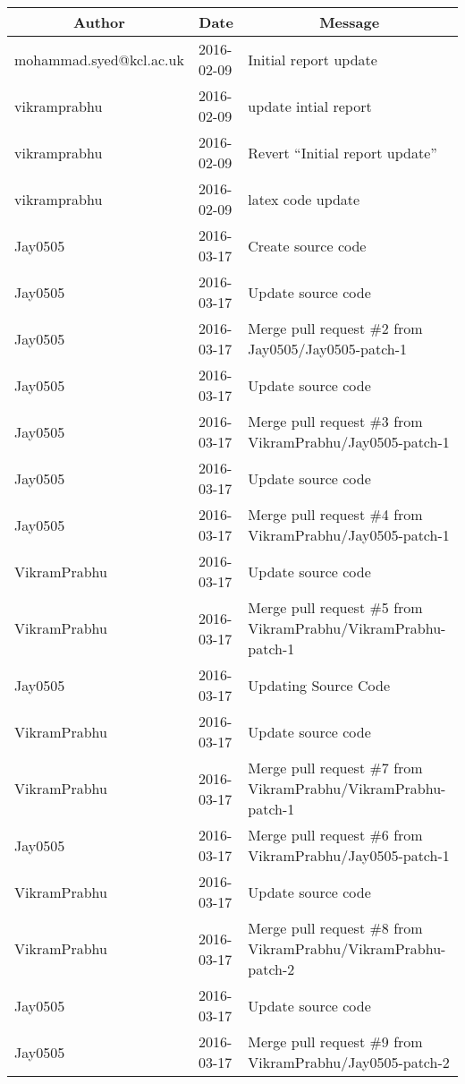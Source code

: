 \documentclass[a4paper]{article}
\begin{document}
\begin{center}
\begin{longtable}{|l|l|l|} \hline \multicolumn{1}{|c|}{	\textbf{Author}} & \multicolumn{1}{c|}{	\textbf{Date}} & \multicolumn{1}{c|}{	\textbf{Message}} \\ \hline 
mohammad.syed@kcl.ac.uk & 2016-02-09 & Initial report update \\ \hline
vikramprabhu & 2016-02-09 & update intial report \\ \hline
vikramprabhu & 2016-02-09 & Revert ``Initial report update'' \\ \hline
vikramprabhu & 2016-02-09 & latex code update \\ \hline
Jay0505 & 2016-03-17 & Create source code \\ \hline
Jay0505 & 2016-03-17 & Update source code \\ \hline
Jay0505 & 2016-03-17 & Merge pull request \#2 from Jay0505/Jay0505-patch-1 \\ \hline
Jay0505 & 2016-03-17 & Update source code \\ \hline
Jay0505 & 2016-03-17 & Merge pull request \#3 from VikramPrabhu/Jay0505-patch-1 \\ \hline
Jay0505 & 2016-03-17 & Update source code \\ \hline
Jay0505 & 2016-03-17 & Merge pull request \#4 from VikramPrabhu/Jay0505-patch-1 \\ \hline
VikramPrabhu & 2016-03-17 & Update source code \\ \hline
VikramPrabhu & 2016-03-17 & Merge pull request \#5 from VikramPrabhu/VikramPrabhu-patch-1 \\ \hline
Jay0505 & 2016-03-17 & Updating Source Code \\ \hline
VikramPrabhu & 2016-03-17 & Update source code \\ \hline
VikramPrabhu & 2016-03-17 & Merge pull request \#7 from VikramPrabhu/VikramPrabhu-patch-1 \\ \hline
Jay0505 & 2016-03-17 & Merge pull request \#6 from VikramPrabhu/Jay0505-patch-1 \\ \hline
VikramPrabhu & 2016-03-17 & Update source code \\ \hline
VikramPrabhu & 2016-03-17 & Merge pull request \#8 from VikramPrabhu/VikramPrabhu-patch-2 \\ \hline
Jay0505 & 2016-03-17 & Update source code \\ \hline
Jay0505 & 2016-03-17 & Merge pull request \#9 from VikramPrabhu/Jay0505-patch-2 \\ \hline

\end{longtable}
\end{center}
\end{document}

